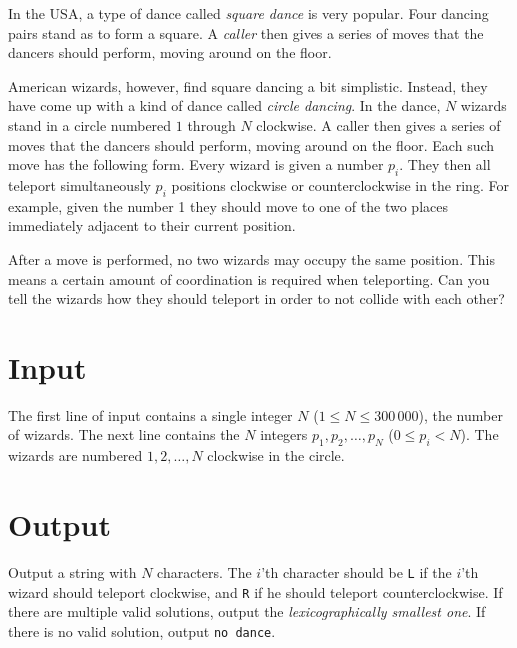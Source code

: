 
\noindent
In the USA, a type of dance called \emph{square dance} is very popular.
Four dancing pairs stand as to form a square.
A \emph{caller} then gives a series of moves that the dancers should perform, moving around on the floor.

American wizards, however, find square dancing a bit simplistic.
Instead, they have come up with a kind of dance called \emph{circle dancing}.
In the dance, $N$ wizards stand in a circle numbered $1$ through $N$ clockwise.
A caller then gives a series of moves that the dancers should perform, moving around on the floor.
Each such move has the following form.
Every wizard is given a number $p_i$.
They then all teleport simultaneously $p_i$ positions clockwise or counterclockwise in the ring.
For example, given the number 1 they should move to one of the two places immediately adjacent to their current position.

After a move is performed, no two wizards may occupy the same position.
This means a certain amount of coordination is required when teleporting.
Can you tell the wizards how they should teleport in order to not collide with each other?

\section*{Input}
The first line of input contains a single integer $N$ ($1 \le N \le 300\,000$), the number of wizards.
The next line contains the $N$ integers $p_1, p_2, \dots, p_N$ ($0 \le p_i < N$).
The wizards are numbered $1, 2, \dots, N$ clockwise in the circle.

\section*{Output}
Output a string with $N$ characters.
The $i$'th character should be \texttt{L} if the $i$'th wizard should teleport clockwise, and \texttt{R} if he should teleport counterclockwise.
If there are multiple valid solutions, output the \emph{lexicographically smallest one}.
If there is no valid solution, output \texttt{no dance}.
